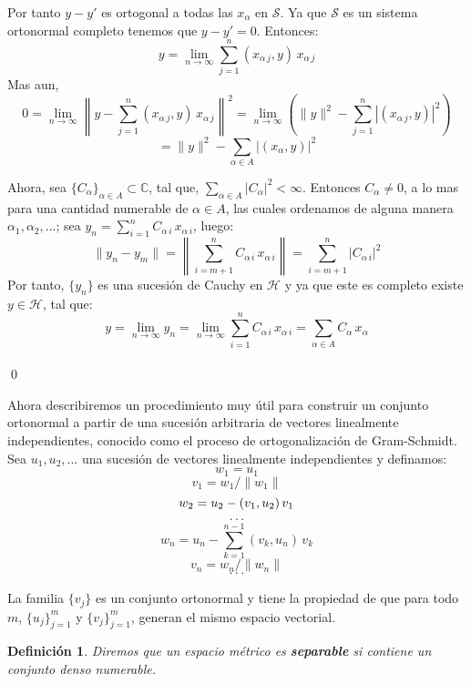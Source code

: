\documentclass[12pt]{book}
\numberwithin{equation}{chapter}
\newtheorem{definition}[theorem]{Definici\'on}
\def\n{\noindent}
\def\C{\mathbb{C}}
\def\S{\mathcal{S}}
\def\rar{\rightarrow}
\def\H{\mathcal{H}}
\begin{document}
Por tanto $y-y'$ es ortogonal a todas las $x_{\alpha}$ en $\S$. Ya que $\S$ es un sistema ortonormal completo tenemos que $y-y'=0$. Entonces:
$$ y= \lim_{n \rar \infty} \sum_{j=1}^{n} ( x_{\alpha\, j},y )\, x_{\alpha\, j} $$
Mas aun,
$$ 0 = \lim_{n \rar \infty} \left\| y - \sum_{j=1}^{n} ( x_{\alpha\,j},y )\, x_{\alpha\, j} \right\|^{2} = \lim_{n \rar \infty} \left( \|y\|^{2} - \sum_{j=1}^{n} |( x_{\alpha\,j},y )|^{2}  \right)  $$
$$ = \|y\|^{2} - \sum_{\alpha \in A} |(x_{\alpha},y)|^{2} $$
 
\n Ahora, sea $\{C_{\alpha}\}_{\alpha \in A} \subset \C $, tal que, $ \sum_{\alpha \in A} |C_{\alpha}|^{2} < \infty$. Entonces $C_{\alpha} \neq 0$, a lo mas para una cantidad numerable de $\alpha \in A$, las cuales ordenamos de alguna manera $ \alpha_{1},\alpha_{2},... $; sea $y_{n} = \sum_{i=1}^{n} C_{\alpha\,i}\, x_{\alpha\, i} $, luego:
$$ \| y_{n}-y_{m} \|= \left\| \sum_{i=m+1}^{n} C_{\alpha\,i}\, x_{\alpha\, i} \right\| = \sum_{i=m+1}^{n} |C_{\alpha\,i}|^{2} $$
Por tanto, $\{y_{n}\}$ es una sucesi\'on de Cauchy en $\H$ y ya que este es completo existe $ y \in \H $, tal que:
$$ y = \lim_{n \rar \infty} y_{n} = \lim_{n \rar \infty} \sum_{i=1}^{n} C_{\alpha\,i}\, x_{\alpha\, i} =\sum_{\alpha \in A} C_{\alpha}\, x_{\alpha} $$\\ \qed

\vspace{5 mm}

Ahora describiremos un procedimiento muy \'util para construir un conjunto ortonormal a partir de una sucesi\'on arbitraria de vectores linealmente independientes, conocido como el proceso de ortogonalizaci\'on de Gram-Schmidt.\\
Sea $ u_{1},u_{2},... $ una sucesi\'on de vectores linealmente independientes y definamos:
$$ w_{1} = u_{1}  $$
$$v_{1} = w_{1}/\|w_{1}\|  $$
$$ w_{2}=u_{2} - ( v_{1},u_{2} )\, v_{1} \\ $$
$$ \cdot \cdot \cdot $$
$$ w_{n}=u_{n} - \sum_{k=1}^{n-1} (v_{k},u_{n})\, v_{k}  $$
$$ v_{n} = w_{n}/\|w_{n}\| $$
$$ \cdot \cdot \cdot $$

\n La familia $\{v_{j}\}$ es un conjunto ortonormal y tiene la propiedad de que para todo $m$, $\{ u_{j} \}_{j=1}^{m}$ y $\{ v_{j} \}_{j=1}^{m}$, generan el mismo espacio vectorial. \\

\begin{definition}
Diremos que un espacio m\'etrico es {\bf separable} si contiene un conjunto denso numerable.
\end{definition}
\end{document}

